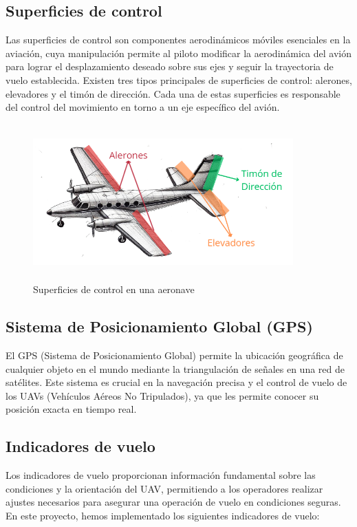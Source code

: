 \subsection{Superficies de control}

Las superficies de control son componentes aerodinámicos móviles esenciales en la aviación, cuya manipulación permite al piloto modificar la aerodinámica del avión para lograr el desplazamiento deseado sobre sus ejes y seguir la trayectoria de vuelo establecida. Existen tres tipos principales de superficies de control: alerones, elevadores y el timón de dirección. Cada una de estas superficies es responsable del control del movimiento en torno a un eje específico del avión. \\
\begin{figure}[H]
    \centering
    \includegraphics[width=10cm, height=6cm]{Imagenes/Marco Teorico/s_control.png}
    \caption{Superficies de control en una aeronave}
    \label{fig:waypoints}
\end{figure}


\subsection{Sistema de Posicionamiento Global (GPS) }

El GPS (Sistema de Posicionamiento Global) permite la ubicación geográfica de cualquier objeto en el mundo mediante la triangulación de señales en una red de satélites. Este sistema es crucial en la navegación precisa y el control de vuelo de los UAVs (Vehículos Aéreos No Tripulados), ya que les permite conocer su posición exacta en tiempo real. \cite{GPS}

\subsection{Indicadores de vuelo}

Los indicadores de vuelo proporcionan información fundamental sobre las condiciones y la orientación del UAV, permitiendo a los operadores realizar ajustes necesarios para asegurar una operación de vuelo en condiciones seguras. En este proyecto, hemos implementado los siguientes indicadores de vuelo:\\

